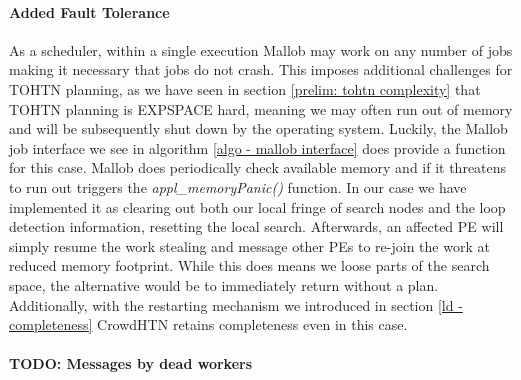 \paragraph{Added Fault Tolerance}
As a scheduler, within a single execution Mallob may work on any number of jobs making it necessary that jobs do not crash. This imposes additional challenges for TOHTN planning, as we have seen in section \ref{prelim: tohtn complexity} that TOHTN planning is EXPSPACE hard, meaning we may often run out of memory and will be subsequently shut down by the operating system. Luckily, the Mallob job interface we see in algorithm \ref{algo - mallob interface} does provide a function for this case. Mallob does periodically check available memory and if it threatens to run out triggers the \textit{appl\_memoryPanic()} function. In our case we have implemented it as clearing out both our local fringe of search nodes and the loop detection information, resetting the local search. Afterwards, an affected PE will simply resume the work stealing and message other PEs to re-join the work at reduced memory footprint. While this does means we loose parts of the search space, the alternative would be to immediately return without a plan. Additionally, with the restarting mechanism we introduced in section \ref{ld - completeness} CrowdHTN retains completeness even in this case.

\paragraph{TODO: Messages by dead workers}

